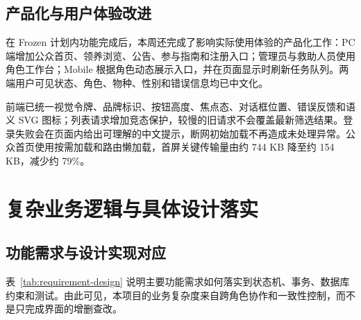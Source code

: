 \documentclass[UTF8,a4paper,zihao=-4,fontset=mac]{ctexart}
\begin{document}
\subsection{产品化与用户体验改进}

在 Frozen 计划内功能完成后，本周还完成了影响实际使用体验的产品化工作：PC 端增加公众首页、领养浏览、公告、参与指南和注册入口；管理员与救助人员使用角色工作台；Mobile 根据角色动态展示入口，并在页面显示时刷新任务队列。两端用户可见状态、角色、物种、性别和错误信息均已中文化。

前端已统一视觉令牌、品牌标识、按钮高度、焦点态、对话框位置、错误反馈和语义 SVG 图标；列表请求增加竞态保护，较慢的旧请求不会覆盖最新筛选结果。登录失败会在页面内给出可理解的中文提示，断网初始加载不再造成未处理异常。公众首页使用按需加载和路由懒加载，首屏关键传输量由约 744 KB 降至约 154 KB，减少约 79\%。

\section{复杂业务逻辑与具体设计落实}

\subsection{功能需求与设计实现对应}

表~\ref{tab:requirement-design} 说明主要功能需求如何落实到状态机、事务、数据库约束和测试。由此可见，本项目的业务复杂度来自跨角色协作和一致性控制，而不是只完成界面的增删查改。
\end{document}
